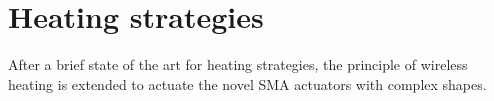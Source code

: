 \chapter{Heating strategies}
After a brief state of the art for heating strategies, the principle of wireless heating is extended to actuate the novel SMA actuators with complex shapes.
